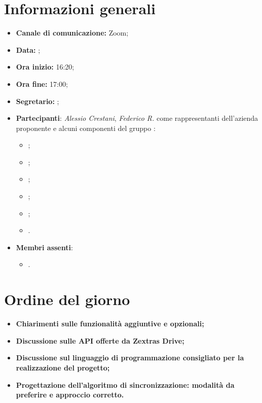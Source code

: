 \section{Informazioni generali}

\begin{itemize}

	\item \textbf{Canale di comunicazione:} Zoom;
	
	\item \textbf{Data:} \DataMeeting{};
	
	\item \textbf{Ora inizio:} 16:20;
	
	\item \textbf{Ora fine:} 17:00;
	
	\item \textbf{Segretario:} \Lucrezia{};
	
	\item \textbf{Partecipanti}: \textit{Alessio Crestani}, \textit{Federico R.} come rappresentanti dell'azienda proponente \proponente{} e alcuni componenti del gruppo \Gruppo{}:
	
		\begin{itemize}
			\item \Daniele{};
			\item \Davide{};
			\item \Francesco{};
			\item \Giosue{};
			\item \Lucrezia{};
			\item \Matteo{}.
		\end{itemize}



	\item \textbf{Membri assenti}:
		\begin{itemize}
			\item \Tommaso{}.
		\end{itemize}
	\end{itemize}
\section{Ordine del giorno}

\begin{itemize}
	\item\textbf{Chiarimenti sulle funzionalità aggiuntive e opzionali;}
	\item\textbf{Discussione sulle API offerte da Zextras Drive;}
	\item\textbf{Discussione sul linguaggio di programmazione consigliato per la realizzazione del progetto;}
	\item\textbf{Progettazione dell'algoritmo di sincronizzazione: modalità da preferire e approccio corretto.}


\end{itemize}

